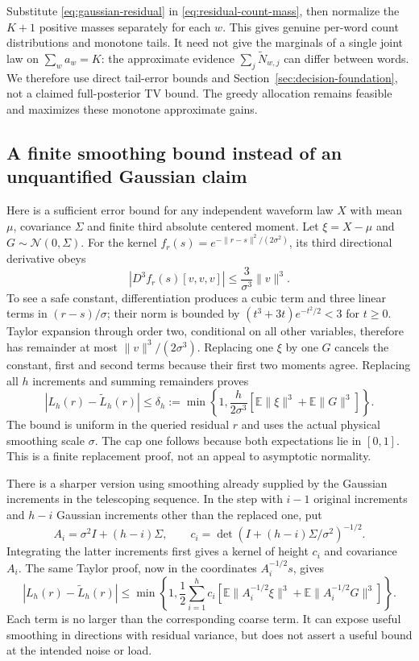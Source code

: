 \documentclass[10pt,a4paper]{article}
\newcommand{\E}{\mathbb E}
\begin{document}
Substitute \eqref{eq:gaussian-residual} in \eqref{eq:residual-count-mass}, then normalize the $K+1$ positive
masses separately for each $w$. This gives genuine per-word count distributions and monotone tails.
It need not give the marginals of a single joint law on $\sum_w a_w=K$: the approximate evidence
$\sum_j\widetilde N_{w,j}$ can differ between words. We therefore use direct tail-error bounds and
Section~\ref{sec:decision-foundation}, not a claimed full-posterior TV bound.
The greedy allocation remains feasible and maximizes these monotone approximate gains.

\subsection{A finite smoothing bound instead of an unquantified Gaussian claim}
Here is a sufficient error bound for any independent waveform law $X$ with mean $\mu$, covariance $\Sigma$
and finite third absolute centered moment. Let $\xi=X-\mu$ and $G\sim\mathcal N(0,\Sigma)$.
For the kernel $f_r(s)=e^{-\|r-s\|^2/(2\sigma^2)}$, its third directional derivative obeys
\[
 |D^3f_r(s)[v,v,v]|\leq \frac{3}{\sigma^3}\|v\|^3.
\]
To see a safe constant, differentiation produces a cubic term and three linear terms in
$(r-s)/\sigma$; their norm is bounded by
$(t^3+3t)e^{-t^2/2}<3$ for $t\geq0$.
Taylor expansion through order two, conditional on all other variables, therefore has remainder at most
$\|v\|^3/(2\sigma^3)$. Replacing one $\xi$ by one $G$ cancels the constant, first and second terms because
their first two moments agree. Replacing all $h$ increments and summing remainders proves
\begin{equation}
 |L_h(r)-\widetilde L_h(r)|
 \leq\delta_h:=
 \min\!\left\{1,\frac{h}{2\sigma^3}
       [\E\|\xi\|^3+\E\|G\|^3]\right\}.
 \label{eq:gaussian-smoothing-coarse}
\end{equation}
The bound is uniform in the queried residual $r$ and uses the actual physical smoothing scale $\sigma$.
The cap one follows because both expectations lie in $[0,1]$. This is a finite replacement proof, not an
appeal to asymptotic normality.

There is a sharper version using smoothing already supplied by the Gaussian increments in the telescoping
sequence. In the step with $i-1$ original increments and $h-i$ Gaussian increments other than the replaced one,
put
\[
 A_i=\sigma^2I+(h-i)\Sigma,\qquad
 c_i=\det(I+(h-i)\Sigma/\sigma^2)^{-1/2}.
\]
Integrating the latter increments first gives a kernel of height $c_i$ and covariance $A_i$. The same
Taylor proof, now in the coordinates $A_i^{-1/2}s$, gives
\begin{equation}
 |L_h(r)-\widetilde L_h(r)|
 \leq\min\!\left\{1,\frac12\sum_{i=1}^h c_i
 \left[\E\|A_i^{-1/2}\xi\|^3+\E\|A_i^{-1/2}G\|^3\right]\right\}.
 \label{eq:gaussian-smoothing-shaped}
\end{equation}
Each term is no larger than the corresponding coarse term. It can expose useful smoothing in directions
with residual variance, but does not assert a useful bound at the intended noise or load.
\end{document}
